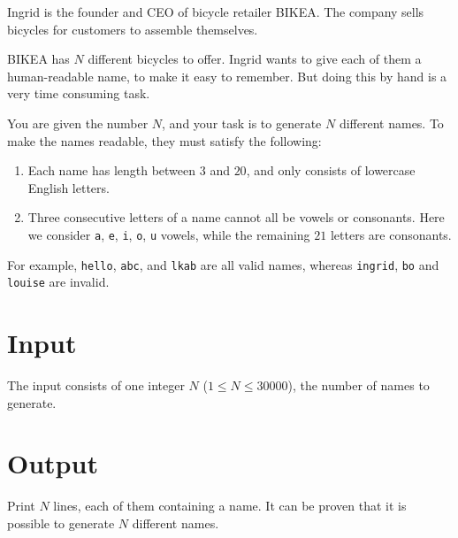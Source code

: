 

Ingrid is the founder and CEO of bicycle retailer BIKEA. The company sells bicycles 
for customers to assemble themselves.

BIKEA has $N$ different bicycles to offer. Ingrid wants to give each of them 
a human-readable name, to make it easy to remember. But doing this by hand is 
a very time consuming task. 

You are given the number $N$, and your task is to generate $N$ different names.
To make the names readable, they must satisfy the following:

\begin{enumerate}
\item Each name has length between $3$ and $20$, and only consists of lowercase 
English letters.
\item Three consecutive letters of a name cannot all be vowels or consonants. 
Here we consider \texttt{a}, \texttt{e}, \texttt{i}, \texttt{o}, \texttt{u} vowels, while the remaining
$21$ letters are consonants.
\end{enumerate}

For example, \texttt{hello}, \texttt{abc}, and \texttt{lkab} are all valid names, whereas \texttt{ingrid}, 
\texttt{bo} and \texttt{louise} are invalid. 

\section*{Input}
The input consists of one integer $N$ ($1 \leq N \leq 30000$), the number of names to generate.

\section*{Output}
Print $N$ lines, each of them containing a name. It can be proven that it is possible to generate
 $N$ different names.
